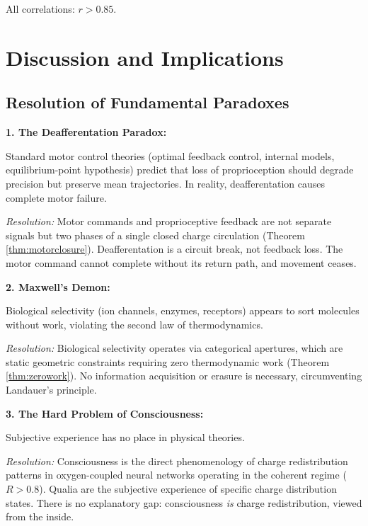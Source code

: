 \documentclass[12pt,a4paper]{article}
\begin{document}
All correlations: $r > 0.85$.

\section{Discussion and Implications}

\subsection{Resolution of Fundamental Paradoxes}

\textbf{1. The Deafferentation Paradox:}

Standard motor control theories (optimal feedback control, internal models, equilibrium-point hypothesis) predict that loss of proprioception should degrade precision but preserve mean trajectories. In reality, deafferentation causes complete motor failure.

\textit{Resolution:} Motor commands and proprioceptive feedback are not separate signals but two phases of a single closed charge circulation (Theorem \ref{thm:motorclosure}). Deafferentation is a circuit break, not feedback loss. The motor command cannot complete without its return path, and movement ceases.

\textbf{2. Maxwell's Demon:}

Biological selectivity (ion channels, enzymes, receptors) appears to sort molecules without work, violating the second law of thermodynamics.

\textit{Resolution:} Biological selectivity operates via categorical apertures, which are static geometric constraints requiring zero thermodynamic work (Theorem \ref{thm:zerowork}). No information acquisition or erasure is necessary, circumventing Landauer's principle.

\textbf{3. The Hard Problem of Consciousness:}

Subjective experience has no place in physical theories.

\textit{Resolution:} Consciousness is the direct phenomenology of charge redistribution patterns in oxygen-coupled neural networks operating in the coherent regime ($R > 0.8$). Qualia are the subjective experience of specific charge distribution states. There is no explanatory gap: consciousness \textit{is} charge redistribution, viewed from the inside.
\end{document}
